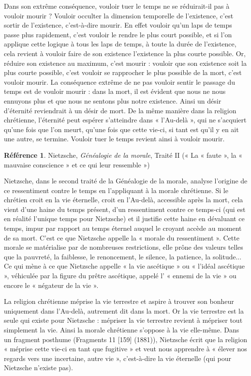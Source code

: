 \documentclass[french]{book}
\theoremstyle{definition}
\newtheorem*{refe}{Référence}
\begin{document}
Dans son extrême conséquence, vouloir tuer le temps ne se réduirait-il pas à vouloir mourir ? Vouloir occulter la dimension temporelle de l’existence, c’est sortir de l’existence, c'est-à-dire mourir. En effet vouloir qu’un laps de temps passe plus rapidement, c’est vouloir le rendre le plus court possible, et si l’on applique cette logique à tous les laps de temps, à toute la durée de l’existence, cela revient à vouloir faire de son existence l’existence la plus courte possible. Or, réduire son existence au maximum, c’est mourir : vouloir que son existence soit la plus courte possible, c’est vouloir se rapprocher le plus possible de la mort, c’est vouloir mourir. La conséquence extrême de ne pas vouloir sentir le passage du temps est de vouloir mourir : dans la mort, il est évident que nous ne nous ennuyons plus et que nous ne sentons plus notre existence. Ainsi un désir d’éternité reviendrait à un désir de mort. De la même manière dans la religion chrétienne, l’éternité peut espérer s’atteindre dans « l’Au-delà », qui ne s’acquiert qu’une fois que l’on meurt, qu’une fois que cette vie-ci, si tant est qu’il y en ait une autre, se termine. Vouloir tuer le temps revient ainsi à vouloir mourir.

\begin{refe}
	Nietzsche, \textit{Généalogie de la morale}, Traité II (« La « faute », la « mauvaise conscience » et ce qui leur ressemble »)
\end{refe}

Nietzsche, dans le second traité de la Généalogie de la morale, analyse l’origine de ce ressentiment contre le temps en l’appliquant à la morale chrétienne. Si le chrétien croit en la vie éternelle, croit en l’Au-delà, accessible après la mort, cela vient d’une haine du temps présent, d’un ressentiment contre ce temps-ci (qui est en réalité l’unique temps pour Nietzsche) et il justifie cette haine en dévaluant ce temps, impur par rapport au temps éternel auquel le croyant accède au moment de sa mort. C’est ce que Nietzsche appelle la « morale du ressentiment ». Cette morale se matérialise par de nombreuses restrictions, elle prône des valeurs telles que la pauvreté, la faiblesse, le renoncement, le silence, la patience, la solitude... Ce qui mène à ce que Nietzsche appelle « la vie ascétique » ou « l’idéal ascétique », véhiculée par la figure du prêtre ascétique, appelé l’ « ennemi de la vie » ou encore le « négateur de la vie ».

La religion chrétienne méprise la vie terrestre et aspire à trouver son bonheur uniquement dans l’Au-delà, autrement dit dans la mort. Or la vie terrestre est la seule qui existe pour Nietzsche : mépriser la vie terrestre revient à mépriser tout simplement la vie. Ainsi la morale chrétienne s’oppose à la vie elle-même. Dans un fragment posthume (Fragments 11 [159] (1881)), Nietzsche écrit que la religion « méprise cette vie-ci en tant que
fugitive » et veut nous apprendre à « élever nos regards vers une incertaine, autre vie », c'est-à-dire la vie éternelle (qui pour Nietzsche n’existe pas).
\end{document}

